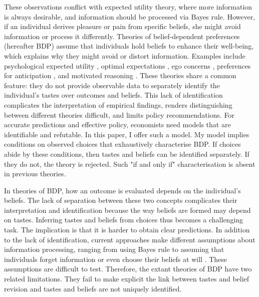 These observations conflict with expected utility theory, where more information is always desirable, and information should be processed via Bayes rule. However, if an individual derives pleasure or pain from specific beliefs, she might avoid information or process it differently. Theories of belief-dependent preferences (hereafter BDP) assume that individuals hold beliefs to enhance their well-being, which explains why they might avoid or distort information. Examples include psychological expected utility \citep{caplinPsychologicalExpectedUtility2001}, optimal expectations \citep{brunnermeierOptimalExpectations2005}, ego concerns \citep{koszegiEgoUtilityOverconfidence2006}, preferences for anticipation \citep{koszegiUtilityAnticipationPersonal2010}, and motivated reasoning \citep{benabouEconomicsMotivatedBeliefs2015,benabou2016mindful}. These theories share a common feature: they do not provide observable data to separately identify the individual’s tastes over outcomes and beliefs. This lack of identification complicates the interpretation of empirical findings, renders distinguishing between different theories difficult, and limits policy recommendations. For accurate predictions and effective policy, economists need models that are identifiable and refutable. In this paper, I offer such a model. My model implies conditions on observed choices that exhaustively characterise BDP. If choices abide by these conditions, then tastes and beliefs can be identified separately. If they do not, the theory is rejected. Such "if and only if" characterisation is absent in previous theories.

In theories of BDP, how an outcome is evaluated depends on the individual's beliefs. The lack of separation between these two concepts complicates their interpretation and identification because the way beliefs are formed may depend on tastes. Inferring tastes and beliefs from choices thus becomes a challenging task. The implication is that it is harder to obtain clear predictions. In addition to the lack of identification, current approaches make different assumptions about information processing, ranging from using Bayes rule \citep{koszegiEgoUtilityOverconfidence2006} to assuming that individuals forget information \citep{benabouEconomicsMotivatedBeliefs2015} or even choose their beliefs at will \citep{brunnermeierOptimalExpectations2005}. These assumptions are difficult to test. Therefore, the extant theories of BDP have two related limitations. They fail to make explicit the link between tastes and belief revision and tastes and beliefs are not uniquely identified.


